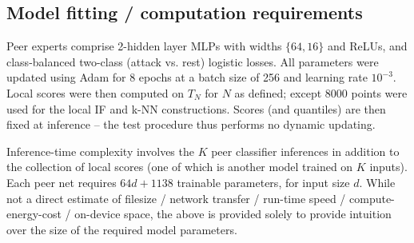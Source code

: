 \subsection{Model fitting / computation requirements} 
Peer experts comprise 2-hidden layer MLPs with widths $\{64,16\}$ and ReLUs, and class-balanced two-class (attack vs. rest) logistic losses. All parameters were updated using Adam for 8 epochs at a batch size of 256 and learning rate $10^{-3}$. Local scores were then computed on $T_N$ for $N$ as defined; except 8000 points were used for the local IF and k-NN constructions. Scores (and quantiles) are then fixed at inference -- the test procedure thus performs no dynamic updating.

Inference-time complexity involves the $K$ peer classifier inferences in addition to the collection of local scores (one of which is another model trained on $K$ inputs). Each peer net requires $64d + 1138$ trainable parameters, for input size $d$. While not a direct estimate of filesize / network transfer / run-time speed / compute-energy-cost / on-device space, the above is provided solely to provide intuition over the size of the required model parameters.




